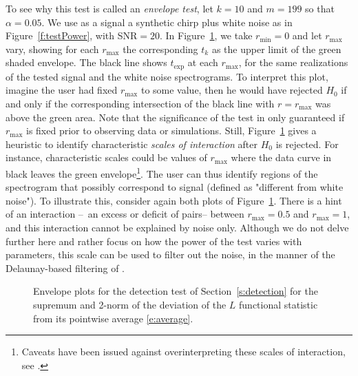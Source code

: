 To see why this test is called an \emph{envelope test}, let $k=10$ and
$m=199$ so that $\alpha=0.05$. We use as a signal a synthetic chirp plus white
noise as in Figure~\ref{f:testPower}, with SNR$=20$. In Figure~\ref{f:envelope}, we take
$r_{\min}=0$ and let $r_{\max}$ vary, showing for each $r_{\max}$ the corresponding $t_{k}$ as the upper limit of the green
shaded envelope. The black line shows $t_{\text{exp}}$ at each $r_{\max}$, for the
same realizations of the tested signal and the white noise spectrograms. To
interpret this plot, imagine the user had fixed $r_{\max}$ to some value, then
he would have rejected $H_0$ if and only if the corresponding intersection of
the black line with $r=r_{\max}$ was above the green area. Note that the
significance of the test in only guaranteed if $r_{\max}$ is fixed prior to
observing data or simulations. Still, Figure~\ref{f:envelope} gives a heuristic
to identify characteristic \emph{scales of interaction} after $H_0$ is rejected.
For instance, characteristic scales could be values of $r_{\max}$ where the data
curve in black leaves the green envelope\footnote{Caveats have been issued against overinterpreting these scales of
  interaction, see \citep{BDHLMN14}.}. The user can thus identify regions of the
spectrogram that possibly correspond to signal (defined as "different from white
noise"). 
To illustrate this, consider again both plots of
Figure~\ref{f:envelope}. There is a hint of an interaction --~an excess or
deficit of pairs-- between
$r_{\max}=0.5$ and $r_{\max}=1$, and this interaction cannot be explained by
noise only. Although we do not delve further here and rather focus on how the
power of the test varies with parameters, this scale can be used to
filter out the noise, in the manner of the Delaunay-based filtering of \cite{Fla15}.

\begin{figure}
\caption{Envelope plots for the detection test of Section~\ref{s:detection} for
  the supremum and 2-norm of the deviation of the $L$ functional statistic from
  its pointwise average \eqref{e:average}.}
\label{f:envelope}
\end{figure}

